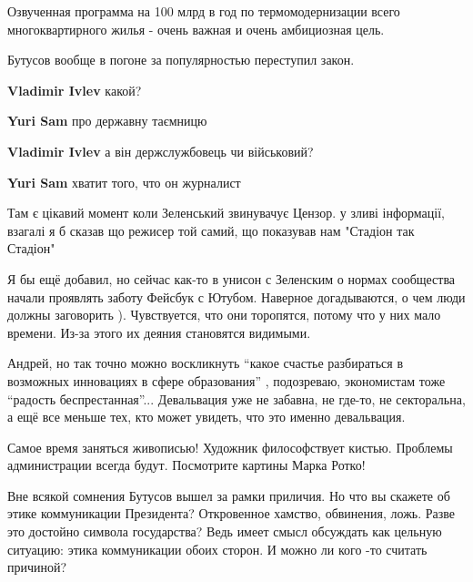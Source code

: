 \begin{itemize}

Озвученная программа на 100 млрд в год по термомодернизации всего
многоквартирного жилья - очень важная и очень амбициозная цель.

Бутусов вообще в погоне за популярностью переступил закон.

\begin{itemize} %
\textbf{Vladimir Ivlev} какой?

\textbf{Yuri Sam} про державну таємницю

\textbf{Vladimir Ivlev} а він держслужбовець чи військовий?

\textbf{Yuri Sam} хватит того, что он журналист
\end{itemize} %


Там є цікавий момент коли Зеленський звинувачує Цензор. у зливі інформації,
взагалі я б сказав що режисер той самий, що показував нам "Стадіон так Стадіон"


Я бы ещё добавил, но сейчас как-то в унисон с Зеленским о нормах сообщества
начали проявлять заботу Фейсбук с Ютубом. Наверное догадываются, о чем люди
должны заговорить ). Чувствуется, что они торопятся, потому что у них мало
времени. Из-за этого их деяния становятся видимыми.


Андрей, но так точно можно воскликнуть \enquote{какое счастье разбираться в возможных
инновациях в сфере образования} , подозреваю, экономистам тоже \enquote{радость
беспрестанная}... Девальвация уже не забавна, не где-то, не секторальна, а ещё
все меньше тех, кто может увидеть, что это именно девальвация.


Самое время заняться живописью! Художник философствует кистью. Проблемы
администрации всегда будут. Посмотрите картины Марка Ротко!


Вне всякой сомнения Бутусов вышел за рамки приличия. Но что вы скажете об этике
коммуникации Президента? Откровенное хамство, обвинения, ложь. Разве это
достойно символа государства? Ведь имеет смысл обсуждать как цельную ситуацию:
этика коммуникации обоих сторон. И можно ли кого -то считать причиной?



\end{itemize}
